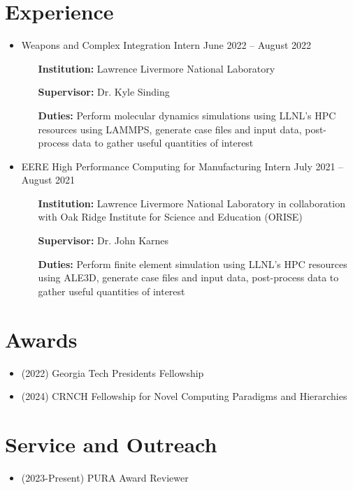 \documentclass{article}
\begin{document}
\section{Experience}
\begin{itemize}
    \item Weapons and Complex Integration Intern \hfill June 2022 -- August 2022
    \begin{itemize}[leftmargin=0.875in]
        \setlength\itemsep{-0.3em}
        \item[\textbf{Institution:}] Lawrence Livermore National Laboratory
        \item[\textbf{Supervisor:}] Dr. Kyle Sinding
        \item[\textbf{Duties:}] Perform molecular dynamics simulations using LLNL's HPC resources using LAMMPS, generate case files and input data, post-process data to gather useful quantities of interest
    \end{itemize}
    \item  EERE High Performance Computing for Manufacturing Intern \hfill July 2021 -- August 2021
    \begin{itemize}[leftmargin=0.875in]
        \setlength\itemsep{-0.3em}
        \item[\textbf{Institution:}] Lawrence Livermore National Laboratory in collaboration with Oak Ridge Institute for Science and Education (ORISE)
        \item[\textbf{Supervisor:}] Dr. John Karnes
        \item[\textbf{Duties:}] Perform finite element simulation using LLNL's HPC resources using ALE3D, generate case files and input data, post-process data to gather useful quantities of interest
    \end{itemize}
\end{itemize}

\section{Awards}
\begin{itemize}
    \item (2022) Georgia Tech Presidents Fellowship
    \item (2024) CRNCH Fellowship for Novel Computing Paradigms and Hierarchies
\end{itemize}

\section{Service and Outreach}
\begin{itemize}
    \item (2023-Present) PURA Award Reviewer
\end{itemize}
\end{document}
